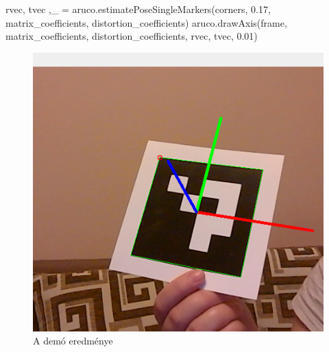 \begin{python}
rvec, tvec ,_ = aruco.estimatePoseSingleMarkers(corners,
0.17, matrix_coefficients, distortion_coefficients)       
aruco.drawAxis(frame, matrix_coefficients, distortion_coefficients, 
rvec, tvec, 0.01)
\end{python}
\begin{figure}[htp]
    \centering
   	\includegraphics[width=4truecm, height=2.8truecm]{images/felismeres_aruco.png}
	\caption{A demó eredménye}
\end{figure}


